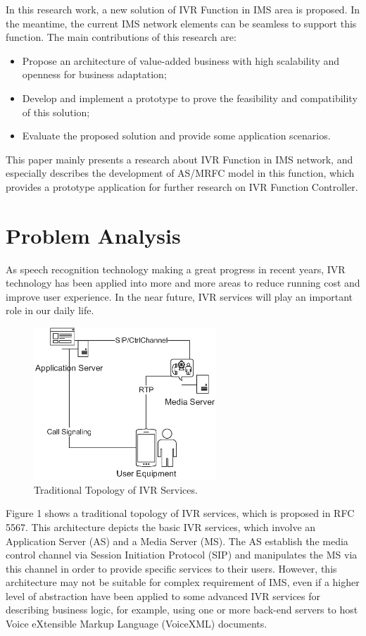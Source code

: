 \documentclass[10pt, conference, a4paper]{IEEEtran}
\begin{document}
In this research work, a new solution of IVR Function in IMS area is proposed. In the meantime, the current IMS network elements can be seamless to support this function. The main contributions of this research are:
\begin{itemize}
\item Propose an architecture of value-added business with high scalability and openness for business adaptation;
\item Develop and implement a prototype to prove the feasibility and compatibility of this solution;
\item Evaluate the proposed solution and provide some application scenarios.
\end{itemize}

This paper mainly presents a research about IVR Function in IMS network, and especially describes the development of AS/MRFC model in this function, which provides a prototype application for further research on IVR Function Controller.

\section{Problem Analysis}

As speech recognition technology making a great progress in recent years, IVR technology has been applied into more and more areas to reduce running cost and improve user experience. In the near future, IVR services will play an important role in our daily life.

\begin{figure}[!t]
\centering
\includegraphics[width=2.7in]{ivr_topology.eps}
\caption{Traditional Topology of IVR Services.}
\end{figure}

Figure 1 shows a traditional topology of IVR services, which is proposed in RFC 5567\cite{misc:rfc5567}. This architecture depicts the basic IVR services, which involve an Application Server (AS) and a Media Server (MS). The AS establish the media control channel via Session Initiation Protocol (SIP) and manipulates the MS via this channel in order to provide specific services to their users. However, this architecture may not be suitable for complex requirement of IMS, even if a higher level of abstraction have been applied to some advanced IVR services for describing business logic, for example, using one or more back-end servers to host Voice eXtensible Markup Language (VoiceXML)\cite{misc:voice.extensible.markup.language} documents.
\end{document}
